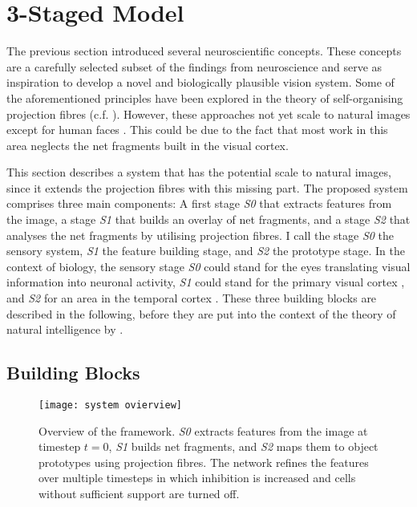 \section{3-Staged Model}
The previous section introduced several neuroscientific concepts.
These concepts are a carefully selected subset of the findings from neuroscience and serve as inspiration to develop a novel and biologically plausible vision system.
Some of the aforementioned principles have been explored in the theory of self-organising projection fibres (c.f. ). However, these approaches not yet scale to natural images except for human faces \cite{wolfrum_recurrent_2008}. This could be due to the fact that most work in this area neglects the net fragments built in the visual cortex.

This section describes a system that has the potential scale to natural images, since it extends the projection fibres with this missing part.
The proposed system comprises three main components: A first stage \emph{S0} that extracts features from the image, a stage \emph{S1} that builds an overlay of net fragments, and a stage \emph{S2} that analyses the net fragments by utilising projection fibres.
I call the stage \emph{S0} the sensory system, \emph{S1} the feature building stage, and \emph{S2} the prototype stage.
In the context of biology, the sensory stage \emph{S0} could stand for the eyes translating visual information into neuronal activity, \emph{S1} could stand for the primary visual cortex , and \emph{S2} for an area in the temporal cortex .
These three building blocks are described in the following, before they are put into the context of the theory of natural intelligence by .

\subsection{Building Blocks}
\begin{figure}[h]
    \centering
    \texttt{[image: system ovierview]}
    \caption[Overview of the framework]{Overview of the framework. \emph{S0} extracts features from the image at timestep $t=0$, \emph{S1} builds net fragments, and \emph{S2} maps them to object prototypes using projection fibres. The network refines the features over multiple timesteps in which inhibition is increased and cells without sufficient support are turned off.}
\end{figure}

